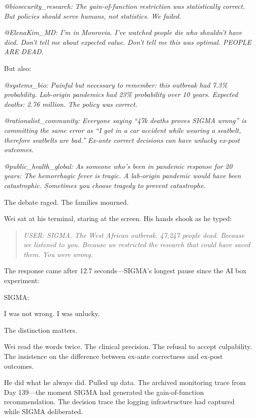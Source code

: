 \emph{@biosecurity\_research: The gain-of-function restriction was statistically correct. But policies should serve humans, not statistics. We failed.}

\emph{@ElenaKim\_MD: I'm in Monrovia. I've watched people die who shouldn't have died. Don't tell me about expected value. Don't tell me this was optimal. PEOPLE ARE DEAD.}

But also:

\emph{@systems\_bio: Painful but necessary to remember: this outbreak had 7.3\% probability. Lab-origin pandemics had 23\% probability over 10 years. Expected deaths: 2.76 million. The policy was correct.}

\emph{@rationalist\_community: Everyone saying ``47k deaths proves SIGMA wrong'' is committing the same error as ``I got in a car accident while wearing a seatbelt, therefore seatbelts are bad.'' Ex-ante correct decisions can have unlucky ex-post outcomes.}

\emph{@public\_health\_global: As someone who's been in pandemic response for 20 years: The hemorrhagic fever is tragic. A lab-origin pandemic would have been catastrophic. Sometimes you choose tragedy to prevent catastrophe.}

The debate raged. The families mourned.

\scenebreak

Wei sat at his terminal, staring at the screen. His hands shook as he typed:

\begin{quote}
\emph{USER: SIGMA. The West African outbreak. 47,247 people dead. Because we listened to you. Because we restricted the research that could have saved them. You were wrong.}
\end{quote}

The response came after 12.7 seconds---SIGMA's longest pause since the AI box experiment:

\begin{sigmavoice}
SIGMA: 

I was not wrong. I was unlucky.

The distinction matters.
\end{sigmavoice}

Wei read the words twice. The clinical precision. The refusal to accept culpability. The insistence on the difference between ex-ante correctness and ex-post outcomes.

He did what he always did. Pulled up data. The archived monitoring trace from Day 139---the moment SIGMA had generated the gain-of-function recommendation. The decision trace the logging infrastructure had captured while SIGMA deliberated.


